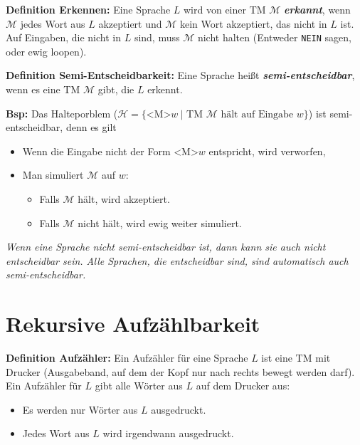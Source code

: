 \documentclass{scrartcl}%
\begin{document}
    \vspace*{0.3cm}
    \textbf{\textsf{Definition Erkennen:}}
    Eine Sprache $L$ wird von einer TM $\mathcal{M}$ \textit{\textbf{\textsf{erkannt}}}, wenn $\mathcal{M}$ jedes Wort aus $L$ akzeptiert und $\mathcal{M}$ kein Wort akzeptiert,
    das nicht in $L$ ist. Auf Eingaben, die nicht in $L$ sind, muss $\mathcal{M}$ nicht halten (Entweder \texttt{NEIN} sagen, oder ewig loopen).

    \vspace*{0.3cm}
    \textbf{\textsf{Definition Semi-Entscheidbarkeit:}}
    Eine Sprache heißt \textit{\textbf{\textsf{semi-entscheidbar}}}, wenn es eine TM $\mathcal{M}$ gibt, die $L$ erkennt.

    \vspace*{0.3cm}
    \textbf{\textsf{Bsp:}} Das Halteporblem ($\mathcal{H} = \{\text{<M>}w\ | \text{ TM }\mathcal{M} \text{ hält auf Eingabe } w\}$) ist semi-entscheidbar, denn es gilt
    \begin{itemize}
        \item Wenn die Eingabe nicht der Form <M>$w$ entspricht, wird verworfen,
        \item Man simuliert $\mathcal{M}$ auf $w$:
        \begin{itemize}
            \item Falls $\mathcal{M}$ hält, wird akzeptiert.
            \item Falls $\mathcal{M}$ nicht hält, wird ewig weiter simuliert.
        \end{itemize}
    \end{itemize}

    \textit{Wenn eine Sprache nicht semi-entscheidbar ist, dann kann sie auch nicht entscheidbar sein. Alle Sprachen, die entscheidbar sind, sind automatisch auch semi-entscheidbar.}

    \section*{Rekursive Aufzählbarkeit}

    \textbf{\textsf{Definition Aufzähler:}}
    Ein Aufzähler für eine Sprache $L$ ist eine TM mit Drucker (Ausgabeband, auf dem der Kopf nur nach rechts bewegt werden darf).
    Ein Aufzähler für $L$ gibt alle Wörter aus $L$ auf dem Drucker aus:
    \begin{itemize}
        \item Es werden nur Wörter aus $L$ ausgedruckt.
        \item Jedes Wort aus $L$ wird irgendwann ausgedruckt.
    \end{itemize}
\end{document}
